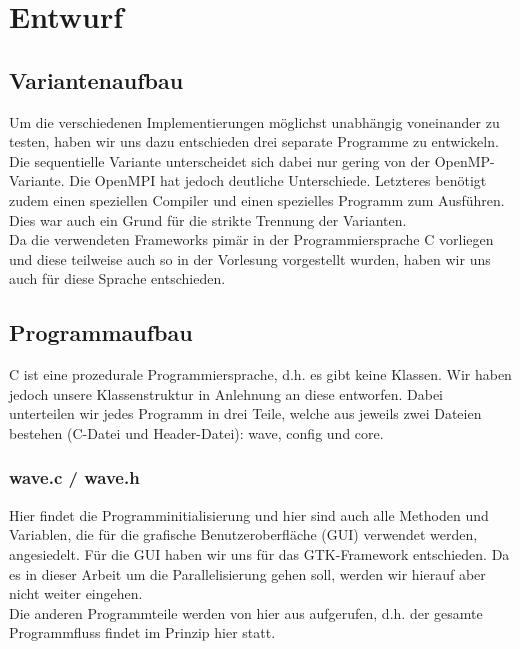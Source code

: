 
\section{Entwurf}
\subsection{Variantenaufbau}
Um die verschiedenen Implementierungen möglichst unabhängig voneinander zu testen, haben wir uns dazu entschieden drei separate Programme zu entwickeln. Die sequentielle Variante unterscheidet sich dabei nur gering von der OpenMP-Variante. Die OpenMPI hat jedoch deutliche Unterschiede. Letzteres benötigt zudem einen speziellen Compiler und einen spezielles Programm zum Ausführen. Dies war auch ein Grund für die strikte Trennung der Varianten.\\
Da die verwendeten Frameworks pimär in der Programmiersprache C vorliegen und diese teilweise auch so in der Vorlesung vorgestellt wurden, haben wir uns auch für diese Sprache entschieden.

\subsection{Programmaufbau}
C ist eine prozedurale Programmiersprache, d.h. es gibt keine Klassen. Wir haben jedoch unsere Klassenstruktur in Anlehnung an diese entworfen. Dabei unterteilen wir jedes Programm in drei Teile, welche aus jeweils zwei Dateien bestehen (C-Datei und Header-Datei): wave, config und core.

\subsubsection{wave.c / wave.h}
Hier findet die Programminitialisierung und hier sind auch alle Methoden und Variablen, die für die grafische Benutzeroberfläche (GUI) verwendet werden, angesiedelt. Für die GUI haben wir uns für das GTK-Framework entschieden. Da es in dieser Arbeit um die Parallelisierung gehen soll, werden wir hierauf aber nicht weiter eingehen.\\
Die anderen Programmteile werden von hier aus aufgerufen, d.h. der gesamte Programmfluss findet im Prinzip hier statt.

